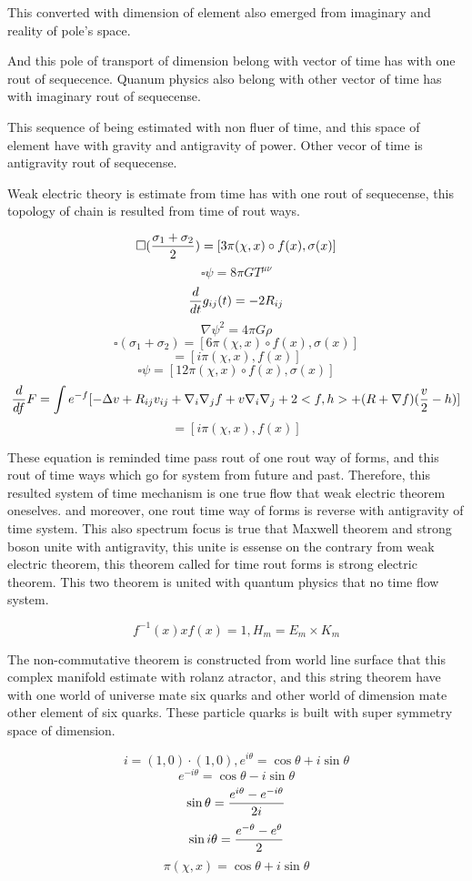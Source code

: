 \documentclass{jsarticle}
\begin{document}
  This converted with dimension of element also emerged from imaginary and 
reality of pole's space.

  And this pole of transport of dimension belong with vector of time has 
with one rout of sequecence. Quanum physics also belong with other vector 
of time has with imaginary rout of sequecense.

 This sequence of being estimated with non fluer of time, and this space 
of element have with gravity and antigravity of power.
Other vecor of time is antigravity rout of sequecense.

 Weak electric theory is estimate from time has with one rout of sequecense,
this topology of chain is resulted from time of rout ways.

      $$ \square ({{\sigma_1 + \sigma_2} \over 2 }) = [3 \pi (\chi,x) \circ f(x),
   \sigma(x)] $$
   $$ \square \psi = 8 \pi G T^{\mu\nu} $$
   $$ {d \over dt}g_{ij}(t) = - 2 R_{ij} $$
   $$ \nabla \psi^2 = 4 \pi G \rho $$
   $$ \square (\sigma_1 + \sigma_2) = [6\pi(\chi,x)\circ f(x), \sigma(x)] $$
   $$ = [i \pi(\chi,x),f(x)] $$
   $$ \square \psi = [12 \pi (\chi,x)\circ f(x), \sigma(x)] $$
   $$ {d \over df} F = \int e^{-f}[- \Delta v + R_{ij} v_{ij}+ 
   \nabla_i \nabla_j f  + v \nabla_i \nabla_j + 2<f,h> + (R + \nabla f)
   ({v \over 2} - h) ] $$
   $$ =[i \pi(\chi,x), f(x)] $$

   These equation is reminded time pass rout of one rout way of forms,
   and this rout of time ways which go for system from future and past.
   Therefore, this resulted system of time mechanism is one true flow
   that weak electric theorem oneselves.
   and moreover, one rout time way of forms is reverse with antigravity of
   time system. This also spectrum focus is true that Maxwell theorem and
   strong boson unite with antigravity, this unite is essense on the contrary
   from weak electric theorem, this theorem called for time rout forms is
   strong electric theorem.
   This two theorem is united with quantum physics that no time flow system.

   $$ f^{-1}(x)xf(x) = 1,H_m = E_m \times K_m $$


   The non-commutative theorem is constructed from world line surface that
   this complex manifold estimate with rolanz atractor, and this string
   theorem have with one world of universe mate six quarks and other world of
   dimension mate other element of six quarks.
   These particle quarks is built with super symmetry space of dimension.

   $$ i = (1,0)\cdot (1,0), e^{i\theta} = \cos \theta + i \sin \theta $$
   $$ e^{-i \theta} = \cos \theta - i\sin \theta $$
   $$ \sin \theta = {e^{i \theta} - e^{-i \theta} \over 2i} $$
   $$ \sin i \theta = {e^{-\theta} - e^{\theta} \over 2} $$
   $$ \pi (\chi,x) = \cos \theta + i \sin \theta $$
\end{document}
